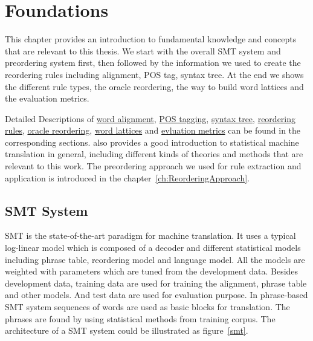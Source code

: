 
\chapter{Foundations}
\label{ch:Foundations}

This chapter provides an introduction to fundamental knowledge and concepts that are relevant to this thesis. We start with the overall \ac{SMT} system and preordering system first, then followed by the information we used to create the reordering rules including alignment, POS tag, syntax tree. At the end we shows the different rule types, the oracle reordering, the way to build word lattices and the evaluation metrics. 

Detailed Descriptions of \hyperref[ch:Foundations:sec:Alignment]{word alignment}, \hyperref[ch:Foundations:sec:PosTag]{POS tagging}, \hyperref[ch:Foundations:sec:SyntacticTree]{syntax tree},
\hyperref[ch:Foundations:sec:types]{reordering rules},
\hyperref[ch:Foundations:sec:oracle]{oracle reordering},
\hyperref[ch:Foundations:sec:Lattices]{word lattices} and 
\hyperref[ch:Foundations:sec:bleu]{evluation metrics} can be found in the corresponding sections. \cite{book} also provides a good introduction to statistical machine translation in general, including different kinds of theories and methods that are relevant to this work. The preordering approach we used for rule extraction and application is introduced in the chapter~\ref{ch:ReorderingApproach}.

\section{\acf{SMT} System}
\label{ch:Foundations:sec:SMTSystem}

\acf{SMT} is the state-of-the-art paradigm for machine translation. It uses a typical log-linear model which is composed of a decoder and different statistical models including phrase table, reordering model and language model. All the models are weighted with parameters which are tuned from the development data. Besides development data, training data are used for training the alignment, phrase table and other models. And test data are used for evaluation purpose. In phrase-based \ac{SMT} system sequences of words are used as basic blocks for translation. The phrases are found by using statistical methods from training corpus. The architecture of a \ac{SMT} system could be illustrated as figure~\ref{smt}.


